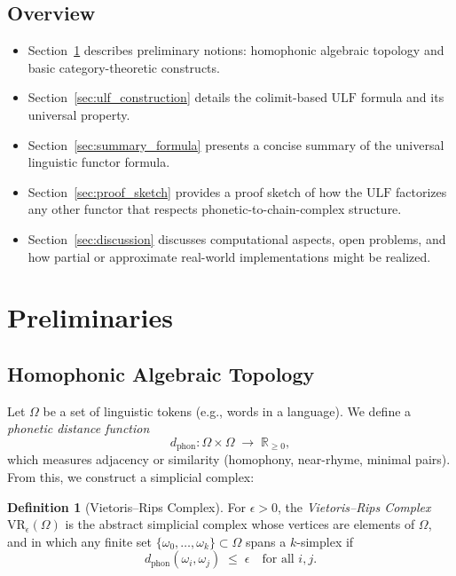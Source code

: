 \documentclass[11pt]{article}
\theoremstyle{definition}
\newtheorem{definition}[theorem]{Definition}
\theoremstyle{remark}
\begin{document}
\subsection*{Overview}
\begin{itemize}
    \item Section~\ref{sec:prelim} describes preliminary notions: homophonic algebraic topology and basic category-theoretic constructs.
    \item Section~\ref{sec:ulf_construction} details the colimit-based \(\mathrm{ULF}\) formula and its universal property.
    \item Section~\ref{sec:summary_formula} presents a concise summary of the universal linguistic functor formula.
    \item Section~\ref{sec:proof_sketch} provides a proof sketch of how the \(\mathrm{ULF}\) factorizes any other functor that respects phonetic-to-chain-complex structure.
    \item Section~\ref{sec:discussion} discusses computational aspects, open problems, and how partial or approximate real-world implementations might be realized.
\end{itemize}

\section{Preliminaries}
\label{sec:prelim}

\subsection{Homophonic Algebraic Topology}
Let \(\Omega\) be a set of linguistic tokens (e.g., words in a language). We define a \emph{phonetic distance function}
\[
d_{\mathrm{phon}}: \Omega \times \Omega \;\longrightarrow\; \mathbb{R}_{\ge 0},
\]
which measures adjacency or similarity (homophony, near-rhyme, minimal pairs). From this, we construct a simplicial complex:

\begin{definition}[Vietoris--Rips Complex]
For \(\epsilon > 0\), the \emph{Vietoris--Rips Complex} \(\mathrm{VR}_\epsilon(\Omega)\) is the abstract simplicial complex whose vertices are elements of \(\Omega\), and in which any finite set \(\{\omega_0,\dots,\omega_k\}\subset \Omega\) spans a \(k\)-simplex if 
\[
d_{\mathrm{phon}}(\omega_i,\omega_j)\; \le \;\epsilon \quad \text{for all } i,j.
\]
\end{definition}
\end{document}
